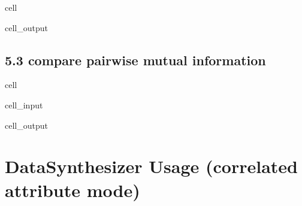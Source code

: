 \documentclass[letterpaper,10pt,english]{jupyterBook}
\begin{document}
\begin{sphinxuseclass}{cell}
\begin{sphinxVerbatimOutput}
\begin{sphinxuseclass}{cell_output}
\noindent{}

\noindent{}

\noindent{}

\noindent{}

\noindent{}

\noindent{}

\end{sphinxuseclass}\end{sphinxVerbatimOutput}

\end{sphinxuseclass}

\section{5.3 compare pairwise mutual information}
\label{\detokenize{src/test/SynthNAV0:compare-pairwise-mutual-information}}
\begin{sphinxuseclass}{cell}\begin{sphinxVerbatimInput}

\begin{sphinxuseclass}{cell_input}
\begin{sphinxVerbatim}[commandchars=\\\{\}]
\end{sphinxVerbatim}

\end{sphinxuseclass}\end{sphinxVerbatimInput}
\begin{sphinxVerbatimOutput}

\begin{sphinxuseclass}{cell_output}
\noindent{}

\end{sphinxuseclass}\end{sphinxVerbatimOutput}

\end{sphinxuseclass}

\chapter{DataSynthesizer Usage (correlated attribute mode)}
\label{\detokenize{src/test/SynthNAV0:datasynthesizer-usage-correlated-attribute-mode}}
\end{document}
